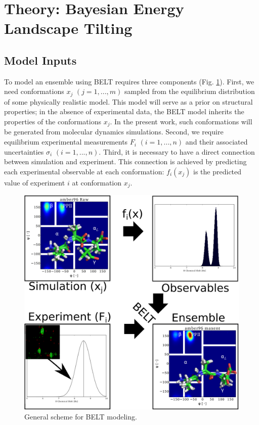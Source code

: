 \documentclass[11pt,titlepage]{article}
\begin{document}
\section*{Theory: Bayesian Energy Landscape Tilting}

\subsection*{Model Inputs}

To model an ensemble using BELT requires three components (Fig. \ref{figure:BELT}).  First, we need conformations $x_j$  $(j = 1 , ... , m)$ sampled from the equilibrium distribution of some physically realistic model.  This model will serve as a prior on structural properties; in the absence of experimental data, the BELT model inherits the properties of the conformations $x_j$.  In the present work, such conformations will be generated from molecular dynamics simulations.  Second, we require equilibrium experimental measurements $F_i$ $(i = 1 , ... , n)$ and their associated uncertainties $\sigma_i$ $(i = 1 , ... , n)$.  Third, it is necessary to have a direct connection between simulation and experiment.  This connection is achieved by predicting each experimental observable at each conformation: $f_i(x_j)$ is the predicted value of experiment $i$ at conformation $x_j$.  

\begin{figure}

\includegraphics[width=16.0cm]{figures/info_graphic/info_graphic.png}

\caption{
General scheme for BELT modeling.
}
\label{figure:BELT}
\end{figure}
\end{document}
